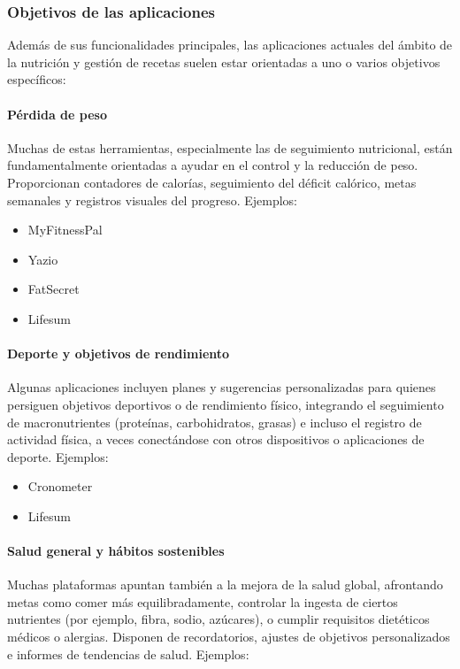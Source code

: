 \subsubsection*{Objetivos de las aplicaciones}

Además de sus funcionalidades principales, las aplicaciones actuales del ámbito de la nutrición y gestión de recetas suelen estar orientadas a uno o varios objetivos específicos:

\paragraph*{Pérdida de peso}
Muchas de estas herramientas, especialmente las de seguimiento nutricional, están fundamentalmente orientadas a ayudar en el control y la reducción de peso. Proporcionan contadores de calorías, seguimiento del déficit calórico, metas semanales y registros visuales del progreso. Ejemplos:

\begin{itemize}
  \item MyFitnessPal
  \item Yazio
  \item FatSecret
  \item Lifesum
\end{itemize}

\paragraph*{Deporte y objetivos de rendimiento}
Algunas aplicaciones incluyen planes y sugerencias personalizadas para quienes persiguen objetivos deportivos o de rendimiento físico, integrando el seguimiento de macronutrientes (proteínas, carbohidratos, grasas) e incluso el registro de actividad física, a veces conectándose con otros dispositivos o aplicaciones de deporte. Ejemplos:

\begin{itemize}
  \item Cronometer
  \item Lifesum
\end{itemize}

\paragraph*{Salud general y hábitos sostenibles}
Muchas plataformas apuntan también a la mejora de la salud global, afrontando metas como comer más equilibradamente, controlar la ingesta de ciertos nutrientes (por ejemplo, fibra, sodio, azúcares), o cumplir requisitos dietéticos médicos o alergias. Disponen de recordatorios, ajustes de objetivos personalizados e informes de tendencias de salud. Ejemplos:

